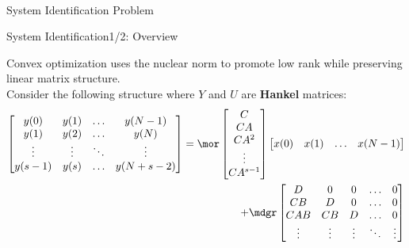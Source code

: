 
\begin{frame}{~}
    \begin{center}
        \huge{System Identification Problem}
    \end{center}
\end{frame}{}


\begin{frame}{System Identification}{1/2: Overview \ \ \cite{vandenberghe2012convex}}

{\bor Convex optimization} uses the nuclear norm to promote low rank while preserving linear matrix structure.\\
\smallskip
Consider the following structure where $Y$ and $U$ are \textbf{Hankel} matrices:
{\scriptsize
\begin{align*}
    \begin{bmatrix}
        y(0) & y(1) & \hdots & y(N-1)\\
        y(1) & y(2) & \hdots & y(N)\\
        \vdots & \vdots & \ddots & \vdots\\
        y(s-1) & y(s) & \hdots & y(N+s-2)
    \end{bmatrix}
    = 
    {\mor \begin{bmatrix}
        C\\ CA\\ CA^2\\ \vdots\\ CA^{s-1}
    \end{bmatrix}}
    \begin{bmatrix}
        x(0) & x(1) & \hdots & x(N-1)
    \end{bmatrix} \\
    + 
    {\mdgr \begin{bmatrix}
        D & 0 & 0 & \hdots & 0\\
        CB & D & 0 & \hdots & 0\\
        CAB & CB & D & \hdots & 0\\
        \vdots & \vdots & \vdots & \ddots & \vdots\\

\end{bmatrix}}
\end{align*}}
\end{frame}
